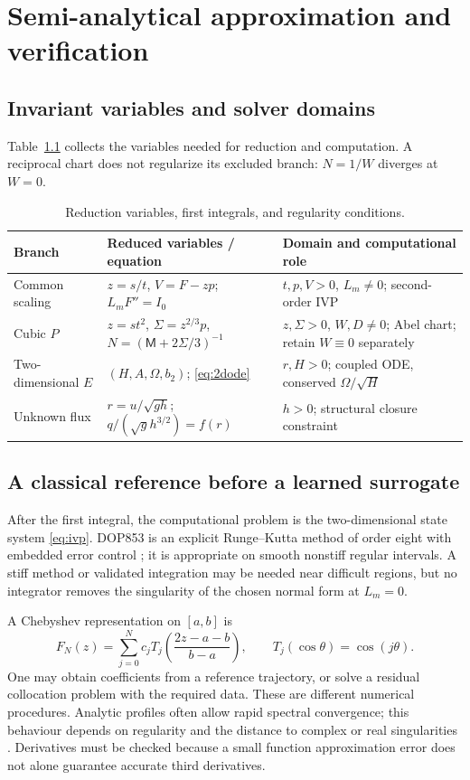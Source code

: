 \documentclass[11pt,a4paper,oneside]{report}
\numberwithin{equation}{chapter}
\begin{document}
\chapter{Semi-analytical approximation and verification}\label{ch:methods}
\section{Invariant variables and solver domains}
Table~\ref{tab:invariants} collects the variables needed for reduction and computation. A reciprocal chart does not regularize its excluded branch: $N=1/W$ diverges at $W=0$.
\begin{table}[!htbp]\centering\small
\begin{tabularx}{\textwidth}{@{}p{}XX@{}}\toprule
Branch & Reduced variables / equation & Domain and computational role\\\midrule
Common scaling & $z=s/t$, $V=F-zp$; $L_mF''=I_0$ & $t,p,V>0$, $L_m\ne0$; second-order IVP\\
Cubic $P$ & $z=st^2$, $\Sigma=z^{2/3}p$, $N=(\mathsf M+2\Sigma/3)^{-1}$ & $z,\Sigma>0$, $W,D\ne0$; Abel chart; retain $W\equiv0$ separately\\
Two-dimensional $E$ & $(H,A,\Omega,b_2)$; \eqref{eq:2dode} & $r,H>0$; coupled ODE, conserved $\Omega/\sqrt H$\\
Unknown flux & $r=u/\sqrt{gh}$; $q/(\sqrt g h^{3/2})=f(r)$ & $h>0$; structural closure constraint\\\bottomrule
\end{tabularx}
\caption{Reduction variables, first integrals, and regularity conditions.}\label{tab:invariants}
\end{table}

\section{A classical reference before a learned surrogate}
After the first integral, the computational problem is the two-dimensional state system \eqref{eq:ivp}. DOP853 is an explicit Runge--Kutta method of order eight with embedded error control \cite{hairer}; it is appropriate on smooth nonstiff regular intervals. A stiff method or validated integration may be needed near difficult regions, but no integrator removes the singularity of the chosen normal form at $L_m=0$.

A Chebyshev representation on $[a,b]$ is
\begin{equation}
F_N(z)=\sum_{j=0}^N c_jT_j\!\left(\frac{2z-a-b}{b-a}\right),\qquad
T_j(\cos\theta)=\cos(j\theta).
\end{equation}
One may obtain coefficients from a reference trajectory, or solve a residual collocation problem with the required data. These are different numerical procedures. Analytic profiles often allow rapid spectral convergence; this behaviour depends on regularity and the distance to complex or real singularities \cite{trefethen}. Derivatives must be checked because a small function approximation error does not alone guarantee accurate third derivatives.
\end{document}

